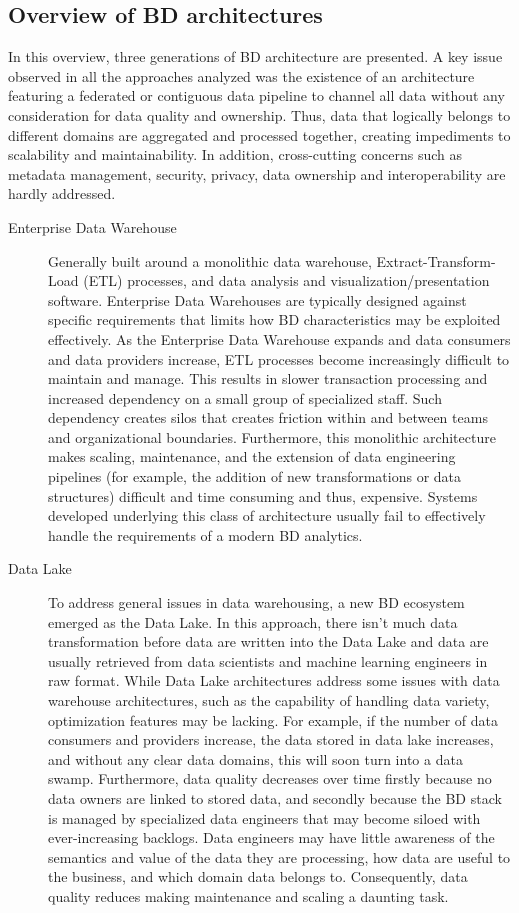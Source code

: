 \documentclass[a4paper,11pt]{article}
\begin{document}
\subsection{Overview of BD architectures}
In this overview, three generations of BD architecture are presented. A key issue observed in all the approaches analyzed was the existence of an architecture featuring a federated or contiguous data pipeline to  channel all data without any consideration for data quality and ownership. Thus, data that logically belongs to different domains are aggregated and processed together, creating impediments to scalability and maintainability. In addition, cross-cutting concerns such as metadata management, security, privacy, data ownership and interoperability are hardly addressed.

\begin{description}
    \item[Enterprise Data Warehouse] Generally built around a monolithic data warehouse, Extract-Transform-Load (ETL) processes, and data analysis and visualization/presentation software. Enterprise Data Warehouses are typically designed against specific requirements that limits how BD characteristics may be exploited effectively. As the Enterprise Data Warehouse expands and data consumers and data providers increase, ETL processes become increasingly difficult to maintain and manage. This results in slower transaction processing and increased dependency on a small group of specialized staff. Such dependency creates silos that creates friction within and between teams and organizational boundaries. Furthermore, this monolithic architecture makes scaling, maintenance, and the extension of data engineering pipelines (for example, the addition of new transformations or data structures)  difficult and time consuming and thus, expensive. Systems developed underlying this class of architecture usually fail to effectively handle the requirements of a modern BD analytics.
    \item[Data Lake] To address general issues in data warehousing, a new BD ecosystem emerged as the Data Lake. In this approach, there isn't much data transformation before data are written into the Data Lake and data are usually retrieved from data scientists and machine learning engineers in raw format. While Data Lake architectures address some issues with data warehouse architectures, such as the capability of handling data variety, optimization features may be lacking. For example, if the number of data consumers and providers increase, the data stored in data lake increases, and without any clear data domains, this will soon turn into a data swamp. Furthermore, data quality decreases over time firstly because no data owners are linked to stored data, and secondly because the BD stack is managed by specialized data engineers that may become siloed with ever-increasing backlogs. Data engineers may have little awareness of the semantics and value of the data they are processing, how data are useful to the business, and which domain data belongs to. Consequently, data quality reduces making maintenance and scaling a daunting task. 

\end{description}
\end{document}
